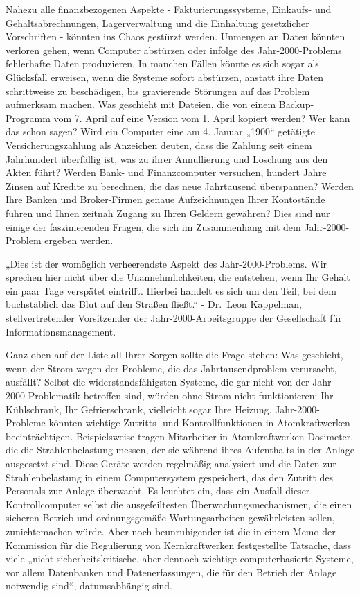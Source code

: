 \documentclass[
  a5paper,
  smalldemyvopaper,10pt,twoside,onecolumn,openright,extrafontsizes,hidelinks]{memoir}
\renewenvironment{quote}%
               {\list{}{\rightmargin=.6cm\leftmargin=.6cm}%
                \itshape \item[]}%
               {\endlist}
\begin{document}
Nahezu alle finanzbezogenen Aspekte - Fakturierungssysteme, Einkaufs-
und Gehaltsabrechnungen, Lagerverwaltung und die Einhaltung gesetzlicher
Vorschriften - könnten ins Chaos gestürzt werden. Unmengen an Daten
könnten verloren gehen, wenn Computer abstürzen oder infolge des
Jahr-2000-Problems fehlerhafte Daten produzieren. In manchen Fällen
könnte es sich sogar als Glücksfall erweisen, wenn die Systeme sofort
abstürzen, anstatt ihre Daten schrittweise zu beschädigen, bis
gravierende Störungen auf das Problem aufmerksam machen. Was geschieht
mit Dateien, die von einem Backup-Programm vom 7. April
 auf eine Version vom 1. April 
kopiert werden? Wer kann das schon sagen? Wird ein Computer eine am 4.
Januar „1900`` getätigte Versicherungszahlung als Anzeichen deuten, dass
die Zahlung seit einem Jahrhundert überfällig ist, was zu ihrer
Annullierung und Löschung aus den Akten führt? Werden Bank- und
Finanzcomputer versuchen, hundert Jahre Zinsen auf Kredite zu berechnen,
die das neue Jahrtausend überspannen? Werden Ihre Banken und
Broker-Firmen genaue Aufzeichnungen Ihrer Kontostände führen und Ihnen
zeitnah Zugang zu Ihren Geldern gewähren? Dies sind nur einige der
faszinierenden Fragen, die sich im Zusammenhang mit dem
Jahr-2000-Problem ergeben werden.

\begin{quote}
„Dies ist der womöglich verheerendste Aspekt des Jahr-2000-Problems. Wir
sprechen hier nicht über die Unannehmlichkeiten, die entstehen, wenn Ihr
Gehalt ein paar Tage verspätet eintrifft. Hierbei handelt es sich um den
Teil, bei dem buchstäblich das Blut auf den Straßen fließt.`` - Dr.~Leon
Kappelman, stellvertretender Vorsitzender der Jahr-2000-Arbeitsgruppe
der Gesellschaft für Informationsmanagement.
\end{quote}

Ganz oben auf der Liste all Ihrer Sorgen sollte die Frage stehen: Was
geschieht, wenn der Strom wegen der Probleme, die das Jahrtausendproblem
verursacht, ausfällt? Selbst die widerstandsfähigsten Systeme, die gar
nicht von der Jahr-2000-Problematik betroffen sind, würden ohne Strom
nicht funktionieren: Ihr Kühlschrank, Ihr Gefrierschrank, vielleicht
sogar Ihre Heizung. Jahr-2000-Probleme könnten wichtige Zutritts- und
Kontrollfunktionen in Atomkraftwerken beeinträchtigen. Beispielsweise
tragen Mitarbeiter in Atomkraftwerken Dosimeter, die die
Strahlenbelastung messen, der sie während ihres Aufenthalts in der
Anlage ausgesetzt sind. Diese Geräte werden regelmäßig analysiert und
die Daten zur Strahlenbelastung in einem Computersystem gespeichert, das
den Zutritt des Personals zur Anlage überwacht. Es leuchtet ein, dass
ein Ausfall dieser Kontrollcomputer selbst die ausgefeiltesten
Überwachungsmechanismen, die einen sicheren Betrieb und ordnungsgemäße
Wartungsarbeiten gewährleisten sollen, zunichtemachen würde. Aber noch
beunruhigender ist die in einem Memo der Kommission für die Regulierung
von Kernkraftwerken festgestellte Tatsache, dass viele „nicht
sicherheitskritische, aber dennoch wichtige computerbasierte Systeme,
vor allem Datenbanken und Datenerfassungen, die für den Betrieb der
Anlage notwendig sind``, datumsabhängig sind.
\end{document}

